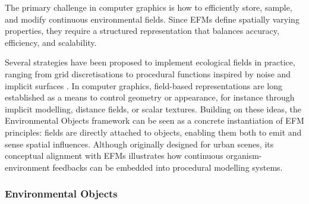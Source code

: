 

The primary challenge in computer graphics is how to efficiently store, sample, and modify continuous environmental fields. Since EFMs define spatially varying properties, they require a structured representation that balances accuracy, efficiency, and scalability.

Several strategies have been proposed to implement ecological fields in practice, ranging from grid discretisations \cite{Wu1985,Seidl2012} to procedural functions inspired by noise and implicit surfaces \cite{Perlin1985,Frisken2000}. In computer graphics, field-based representations are long established as a means to control geometry or appearance, for instance through implicit modelling, distance fields, or scalar textures. Building on these ideas, the Environmental Objects framework \cite{Grosbellet2016} can be seen as a concrete instantiation of EFM principles: fields are directly attached to objects, enabling them both to emit and sense spatial influences. Although originally designed for urban scenes, its conceptual alignment with EFMs illustrates how continuous organism-environment feedbacks can be embedded into procedural modelling systems.


\subsubsection{Environmental Objects}

